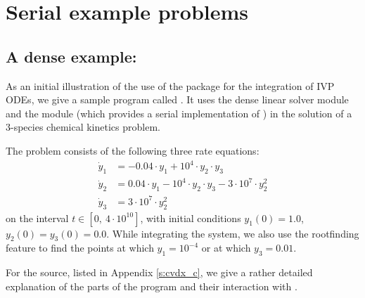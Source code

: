 \section{Serial example problems}\label{s:ex_serial}

\subsection{A dense example: }\label{ss:cvdx}

As an initial illustration of the use of the {\cvode} package for the
integration of IVP ODEs, we give a sample program called .
It uses the {\cvode} dense linear solver module {\cvdense} 
and the {\nvecs} module (which provides a serial implementation of {\nvector})
in the solution of a 3-species chemical kinetics problem.

The problem consists of the following three rate equations:
\vspace*{-.08in}
\begin{equation}
  \begin{split}
    \dot{y}_1 &= -0.04 \cdot y_1 + 10^4 \cdot y_2 \cdot y_3 \\
    \dot{y}_2 &=  0.04 \cdot y_1 - 10^4 \cdot y_2 \cdot y_3
                                  - 3 \cdot 10^7 \cdot y_2^2 \\
    \dot{y}_3 &=  3 \cdot 10^7 \cdot y_2^2
  \end{split} 
\end{equation}
on the interval $t \in [0, ~4 \cdot 10^{10}]$, with initial conditions
$y_1(0) = 1.0$, $y_2(0) = y_3(0) = 0.0$.
While integrating the system, we also use the rootfinding
feature to find the points at which $y_1 = 10^{-4}$ or at which
$y_3 = 0.01$.

For the source, listed in Appendix \ref{s:cvdx_c}, we give a rather detailed
explanation of the parts of the program and their interaction with {\cvode}.

